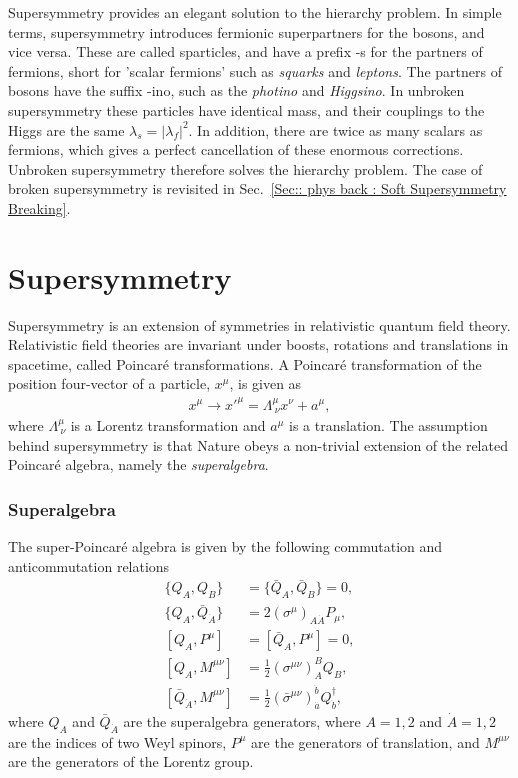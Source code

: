 \documentclass[twoside,english]{uiofysmaster}
\begin{document}
Supersymmetry provides an elegant solution to the hierarchy problem. In simple terms, supersymmetry introduces fermionic superpartners for the bosons, and vice versa. These are called sparticles, and have a prefix -s for the partners of fermions, short for 'scalar fermions' such as \textit{squarks} and \textit{leptons}. The partners of bosons have the suffix -ino, such as the \textit{photino} and \textit{Higgsino}. In unbroken supersymmetry these particles have identical mass, and their couplings to the Higgs are the same $\lambda_s = |\lambda_f|^2$. In addition, there are twice as many scalars as fermions, which gives a perfect cancellation of these enormous corrections. Unbroken supersymmetry therefore solves the hierarchy problem. The case of broken supersymmetry is revisited in Sec.~\ref{Sec:: phys back : Soft Supersymmetry Breaking}.


\section{Supersymmetry}

Supersymmetry is an extension of symmetries in relativistic quantum field theory. Relativistic field theories are invariant under boosts, rotations and translations in spacetime, called Poincar\'{e} transformations. A Poincar\'{e} transformation of the position four-vector of a particle, $x^{\mu}$, is given as
\begin{align}
x^{\mu} \rightarrow x'^{\mu} = \Lambda^{\mu}_{\ \nu} x^{\nu} + a^{\mu}, 
\end{align}
where $\Lambda^{\mu}_{\ \nu}$ is a Lorentz transformation and $a^{\mu}$ is a translation. The assumption behind supersymmetry is that Nature obeys a non-trivial extension of the related Poincar\'{e} algebra, namely the \textit{superalgebra}. 

\subsubsection{Superalgebra}

The super-Poincar\'{e} algebra is given by the following commutation and anticommutation relations \cite{kvellestad2015chasing}
\begin{align}
\{Q_A, Q_B \} &= \{ \bar{Q}_A, \bar{Q}_B\} = 0,\\
\{Q_A, \bar{Q}_{\dot{A}} \} &= 2 (\sigma^{\mu})_{A \dot{A}} P_{\mu},\\
[Q_A, P^{\mu}] &= [\bar{Q}_A, P^{\mu}] = 0,\label{Eq:: [Q,P]}\\
[Q_A, M^{\mu \nu}] &= \frac{1}{2} (\sigma^{\mu \nu})_A^B Q_B,\\
[\bar{Q}_{\dot{A}}, M^{\mu \nu}] &= \frac{1}{2} (\bar{\sigma}^{\mu \nu})_{\dot{a}}^{\dot{b}} Q_{\dot{b}}^{\dagger},  
\end{align}
where $Q_A$ and $\bar{Q}_{\dot{A}}$ are the superalgebra generators, where $A=1,2$ and $\dot{A}=1,2$ are the indices of two Weyl spinors, $P^{\mu}$ are the generators of translation, and $M^{\mu \nu}$ are the generators of the Lorentz group. 
\end{document}
